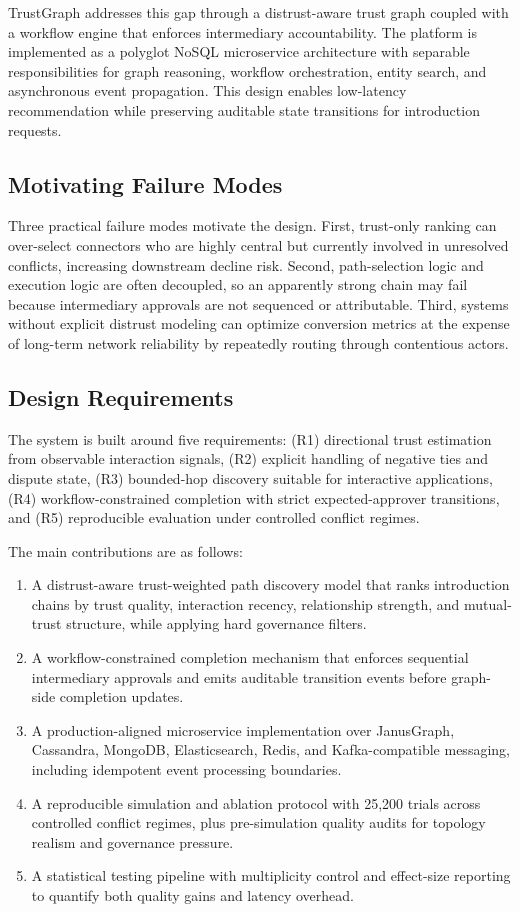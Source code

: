 \documentclass[conference]{IEEEtran}
\begin{document}
TrustGraph addresses this gap through a distrust-aware trust graph coupled with a workflow engine that enforces intermediary accountability. The platform is implemented as a polyglot NoSQL microservice architecture with separable responsibilities for graph reasoning, workflow orchestration, entity search, and asynchronous event propagation. This design enables low-latency recommendation while preserving auditable state transitions for introduction requests.

\subsection{Motivating Failure Modes}
Three practical failure modes motivate the design. First, trust-only ranking can over-select connectors who are highly central but currently involved in unresolved conflicts, increasing downstream decline risk. Second, path-selection logic and execution logic are often decoupled, so an apparently strong chain may fail because intermediary approvals are not sequenced or attributable. Third, systems without explicit distrust modeling can optimize conversion metrics at the expense of long-term network reliability by repeatedly routing through contentious actors.

\subsection{Design Requirements}
The system is built around five requirements: (R1) directional trust estimation from observable interaction signals, (R2) explicit handling of negative ties and dispute state, (R3) bounded-hop discovery suitable for interactive applications, (R4) workflow-constrained completion with strict expected-approver transitions, and (R5) reproducible evaluation under controlled conflict regimes.

The main contributions are as follows:
\begin{enumerate}
    \item A distrust-aware trust-weighted path discovery model that ranks introduction chains by trust quality, interaction recency, relationship strength, and mutual-trust structure, while applying hard governance filters.
    \item A workflow-constrained completion mechanism that enforces sequential intermediary approvals and emits auditable transition events before graph-side completion updates.
    \item A production-aligned microservice implementation over JanusGraph, Cassandra, MongoDB, Elasticsearch, Redis, and Kafka-compatible messaging, including idempotent event processing boundaries.
    \item A reproducible simulation and ablation protocol with 25,200 trials across controlled conflict regimes, plus pre-simulation quality audits for topology realism and governance pressure.
    \item A statistical testing pipeline with multiplicity control and effect-size reporting to quantify both quality gains and latency overhead.
\end{enumerate}
\end{document}
